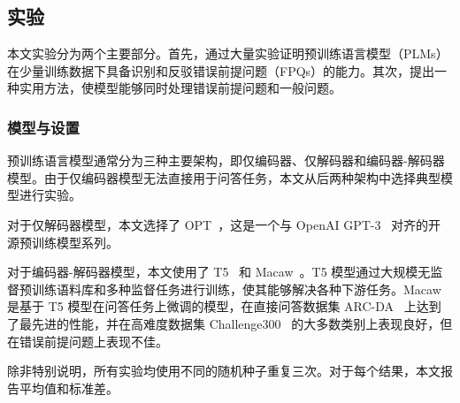\subsection{实验}
\label{sec:exp}
本文实验分为两个主要部分。首先，通过大量实验证明预训练语言模型（PLMs）在少量训练数据下具备识别和反驳错误前提问题（FPQs）的能力。其次，提出一种实用方法，使模型能够同时处理错误前提问题和一般问题。

\subsubsection{模型与设置}
预训练语言模型通常分为三种主要架构，即仅编码器、仅解码器和编码器-解码器模型。由于仅编码器模型无法直接用于问答任务，本文从后两种架构中选择典型模型进行实验。

对于仅解码器模型，本文选择了 OPT~\cite{zhang2022opt}，这是一个与 OpenAI GPT-3~\cite{brown2020language} 对齐的开源预训练模型系列。

对于编码器-解码器模型，本文使用了 T5~\cite{raffel2020exploring} 和 Macaw~\cite{tafjord2021general}。T5 模型通过大规模无监督预训练语料库和多种监督任务进行训练，使其能够解决各种下游任务。Macaw 是基于 T5 模型在问答任务上微调的模型，在直接问答数据集 ARC-DA~\cite{bhakthavatsalam2021think} 上达到了最先进的性能，并在高难度数据集 Challenge300~\cite{tafjord2021general} 的大多数类别上表现良好，但在错误前提问题上表现不佳。

除非特别说明，所有实验均使用不同的随机种子重复三次。对于每个结果，本文报告平均值和标准差。

\begin{table}
\centering
\caption{错误前提问题的二分类结果}
    \label{tab:binary}
\end{table}

